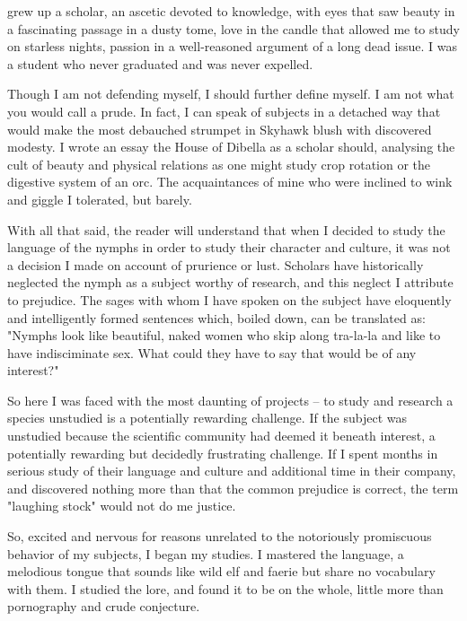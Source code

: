 
 grew up a scholar, an ascetic devoted to knowledge, with eyes that saw beauty in a fascinating passage in a dusty tome, love in the candle that allowed me to study on starless nights, passion in a well-reasoned argument of a long dead issue. I was a student who never graduated and was never expelled.

Though I am not defending myself, I should further define myself. I am not what you would call a prude. In fact, I can speak of subjects in a detached way that would make the most debauched strumpet in Skyhawk blush with discovered modesty. I wrote an essay the House of Dibella as a scholar should, analysing the cult of beauty and physical relations as one might study crop rotation or the digestive system of an orc. The acquaintances of mine who were inclined to wink and giggle I tolerated, but barely.

With all that said, the reader will understand that when I decided to study the language of the nymphs in order to study their character and culture, it was not a decision I made on account of prurience or lust. Scholars have historically neglected the nymph as a subject worthy of research, and this neglect I attribute to prejudice. The sages with whom I have spoken on the subject have eloquently and intelligently formed sentences which, boiled down, can be translated as: "Nymphs look like beautiful, naked women who skip along tra-la-la and like to have indisciminate sex. What could they have to say that would be of any interest?"

So here I was faced with the most daunting of projects -- to study and research a species unstudied is a potentially rewarding challenge. If the subject was unstudied because the scientific community had deemed it beneath interest, a potentially rewarding but decidedly frustrating challenge. If I spent months in serious study of their language and culture and additional time in their company, and discovered nothing more than that the common prejudice is correct, the term "laughing stock" would not do me justice.

So, excited and nervous for reasons unrelated to the notoriously promiscuous behavior of my subjects, I began my studies. I mastered the language, a melodious tongue that sounds like wild elf and faerie but share no vocabulary with them. I studied the lore, and found it to be on the whole, little more than pornography and crude conjecture.

